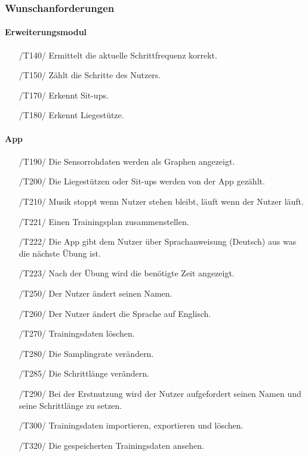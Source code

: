 \documentclass[a4paper,12pt]{article}
\begin{document}
\subsubsection{Wunschanforderungen}
  \paragraph{Erweiterungsmodul}
    \begin{itemize}
    \item[/T140/] Ermittelt die aktuelle \Gls{Schrittfrequenz} korrekt.
    \item[/T150/] Zählt die Schritte des Nutzers.
    \item[/T170/] Erkennt Sit-ups.
    \item[/T180/] Erkennt Liegestütze.
  \end{itemize}
  \paragraph{App}
  \begin{itemize}
    \item[/T190/] Die Sensorrohdaten werden als Graphen angezeigt.
    \item[/T200/] Die Liegestützen oder Sit-ups werden von der App gezählt.
    \item[/T210/] Musik stoppt wenn Nutzer stehen bleibt, läuft wenn der Nutzer läuft.
    \item[/T221/] Einen Trainingsplan zusammenstellen.
    \item[/T222/] Die App gibt dem Nutzer über Sprachanweisung (Deutsch) aus was die nächste Übung ist.
    \item[/T223/] Nach der Übung wird die benötigte Zeit angezeigt.
    \item[/T250/] Der Nutzer ändert seinen Namen.
    \item[/T260/] Der Nutzer ändert die Sprache auf Englisch.
    \item[/T270/] Trainingsdaten löschen.
    \item[/T280/] Die Samplingrate verändern.
    \item[/T285/] Die Schrittlänge verändern.
    \item[/T290/] Bei der Erstnutzung wird der Nutzer aufgefordert seinen Namen und seine Schrittlänge zu setzen.
    \item[/T300/] Trainingsdaten importieren, exportieren und löschen.
    \item[/T320/] Die gespeicherten Trainingsdaten ansehen.
   \end{itemize}
   
\end{document}
